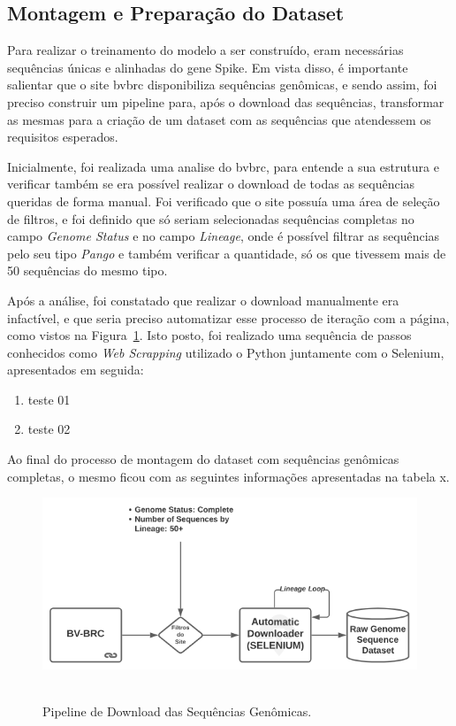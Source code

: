 \subsection{Montagem e Preparação do Dataset}
Para realizar o treinamento do modelo a ser construído, eram necessárias sequências únicas e alinhadas do gene Spike. Em vista disso, é importante salientar que o site \gls{bvbrc} disponibiliza sequências genômicas, e sendo assim, foi preciso construir um pipeline para, após o download das sequências, transformar as mesmas para a criação de um dataset com as sequências que atendessem os requisitos esperados.

Inicialmente, foi realizada uma analise do \gls{bvbrc}, para entende a sua estrutura e verificar também se era possível realizar o download de todas as sequências queridas de forma manual. Foi verificado que o site possuía uma área de seleção de filtros, e foi definido que só seriam selecionadas sequências completas no campo \textit{Genome Status} e no campo \textit{Lineage}, onde é possível filtrar as sequências pelo seu tipo \textit{Pango} e também verificar a quantidade, só os que tivessem mais de 50 sequências do mesmo tipo.

Após a análise, foi constatado que realizar o download manualmente era infactível, e que seria preciso automatizar esse processo de iteração com a página, como vistos na Figura~\ref{fig:pipelineBvbrc}. Isto posto, foi realizado uma sequência de passos conhecidos como \textit{Web Scrapping} utilizado o Python juntamente com o Selenium, apresentados em seguida:

\begin{enumerate}
  \item teste 01
  \item teste 02
\end{enumerate}

Ao final do processo de montagem do dataset com sequências genômicas completas, o mesmo ficou com as seguintes informações apresentadas na tabela x.

\begin{figure}[htb]
  \centering
  \caption{Pipeline de Download das Sequências Genômicas.}
  \includegraphics[scale=0.6]{figuras/pipelines/bvbrc.png}
  ~\label{fig:pipelineBvbrc}
\end{figure}

